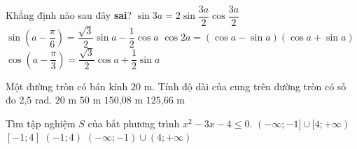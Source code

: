 \begin{ex}%
	Khẳng định nào sau đây {\bf sai}?
	\choice
	{$ \sin3a=2\sin\dfrac{3a}{2}\cos\dfrac{3a}{2} $}
	{$ \sin\left(a-\dfrac{\pi}{6}\right)=\dfrac{\sqrt{3}}{2}\sin a-\dfrac{1}{2}\cos a $}
	{$ \cos2a=(\cos a-\sin a)(\cos a+\sin a) $}
	{\True $ \cos\left(a-\dfrac{\pi}{3}\right)=\dfrac{\sqrt{3}}{2}\cos a+\dfrac{1}{2}\sin a $}
\end{ex}
\begin{ex}%
	Một đường tròn có bán kính $ 20 $ m. Tính độ dài của cung trên đường tròn có số đo $ 2\text{,}5$ rad.
	\choice
	{$ 20 $ m}
	{\True $ 50 $ m}
	{$ 150\text{,}08 $ m}
	{$ 125\text{,}66 $ m}
\end{ex}
\begin{ex}%
	Tìm tập nghiệm $ S $ của bất phương trình $ x^2-3x-4\le 0. $
	\choice
	{$ (-\infty;-1]\cup [4;+\infty) $}
	{\True $ [-1;4] $}
	{$ (-1;4) $}
	{$ (-\infty;-1)\cup (4;+\infty) $}
\end{ex}

